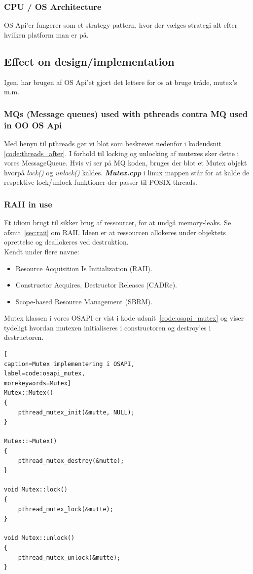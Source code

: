 \subsubsection{CPU / OS Architecture}

OS Api'er fungerer som et strategy pattern, hvor der vælges strategi alt efter hvilken platform man er på.

\subsection{Effect on design/implementation}

Igen, har brugen af OS Api'et gjort det lettere for os at bruge tråde, mutex's m.m.

\subsubsection{MQs (Message queues) used with pthreads contra MQ used in OO OS Api}
Med henyn til pthreads gør vi blot som beskrevet nedenfor i kodeudsnit \ref{code:threads_after}. I forhold til locking og unlocking af mutexes sker dette i vores MessageQueue. Hvis vi ser på MQ koden, bruges der blot et Mutex objekt hvorpå \textit{lock()} og \textit{unlock()} kaldes. \textbf{\textit{Mutex.cpp}} i linux mappen står for at kalde de respektive lock/unlock funktioner der passer til POSIX threads.

\subsubsection{RAII in use}
Et idiom brugt til sikker brug af ressourcer, for at undgå memory-leaks. Se afsnit~\ref{sec:raii} om RAII. Ideen er at ressourcen allokeres under objektets oprettelse og deallokeres ved destruktion.\\

Kendt under flere navne: 
\begin{itemize}
	\item Resource Acquisition Is Initialization (RAII).
	\item Constructor Acquires, Destructor Releases (CADRe).
	\item Scope-based Resource Management (SBRM).
\end{itemize}

Mutex klassen i vores OSAPI er vist i kode udsnit~\ref{code:osapi_mutex} og viser tydeligt hvordan mutexen initialiseres i constructoren og destroy'es i destructoren.

\begin{lstlisting}[
caption=Mutex implementering i OSAPI,
label=code:osapi_mutex, 
morekeywords=Mutex]
Mutex::Mutex()
{ 
	pthread_mutex_init(&mutte, NULL);
}

Mutex::~Mutex()
{
	pthread_mutex_destroy(&mutte);
}

void Mutex::lock()
{
	pthread_mutex_lock(&mutte);
}

void Mutex::unlock()
{
	pthread_mutex_unlock(&mutte);
}
\end{lstlisting}

